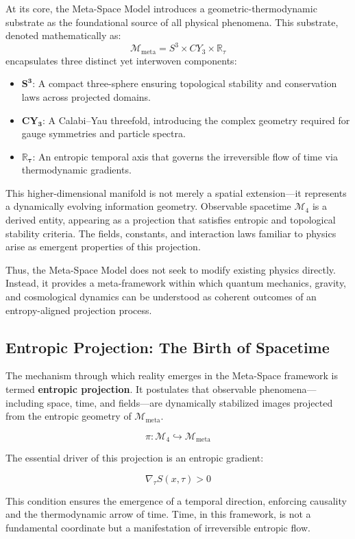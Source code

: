 \documentclass[10.5pt,a4paper]{article}
\begin{document}
At its core, the Meta-Space Model introduces a geometric-thermodynamic substrate as the foundational source of all physical phenomena. This substrate, denoted mathematically as:
\[
\mathcal{M}_{\text{meta}} = S^3 \times CY_3 \times \mathbb{R}_\tau
\]
encapsulates three distinct yet interwoven components:
\begin{itemize}
    \item \(\mathbf{S^3}\): A compact three-sphere ensuring topological stability and conservation laws across projected domains.
    \item \(\mathbf{CY_3}\): A Calabi--Yau threefold, introducing the complex geometry required for gauge symmetries and particle spectra.
    \item \(\mathbf{\mathbb{R}_\tau}\): An entropic temporal axis that governs the irreversible flow of time via thermodynamic gradients.
\end{itemize}

This higher-dimensional manifold is not merely a spatial extension—it represents a dynamically evolving information geometry. Observable spacetime \(\mathcal{M}_4\) is a derived entity, appearing as a projection that satisfies entropic and topological stability criteria. The fields, constants, and interaction laws familiar to physics arise as emergent properties of this projection.

Thus, the Meta-Space Model does not seek to modify existing physics directly. Instead, it provides a meta-framework within which quantum mechanics, gravity, and cosmological dynamics can be understood as coherent outcomes of an entropy-aligned projection process.

\subsection{Entropic Projection: The Birth of Spacetime}

The mechanism through which reality emerges in the Meta-Space framework is termed \textbf{entropic projection}. It postulates that observable phenomena—including space, time, and fields—are dynamically stabilized images projected from the entropic geometry of \(\mathcal{M}_{\text{meta}}\).

\[
\pi: \mathcal{M}_4 \hookrightarrow \mathcal{M}_{\text{meta}}
\]

The essential driver of this projection is an entropic gradient:

\[
\nabla_\tau S(x, \tau) > 0
\]

This condition ensures the emergence of a temporal direction, enforcing causality and the thermodynamic arrow of time. Time, in this framework, is not a fundamental coordinate but a manifestation of irreversible entropic flow.
\end{document}
